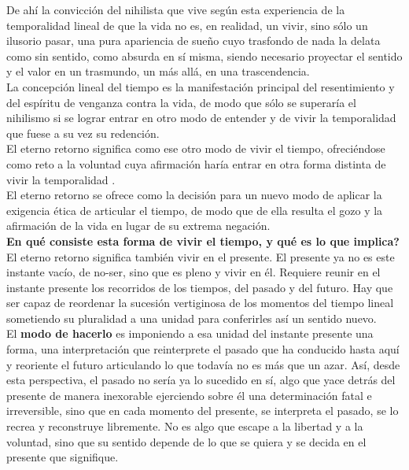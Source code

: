 \documentclass[a4paper, 10pt, twocolumn, spanish]{article}
\begin{document}
De ahí la convicción del nihilista que vive según esta experiencia de
la temporalidad lineal de que la vida no es, en realidad, un vivir,
sino sólo un ilusorio pasar, una pura apariencia de sueño cuyo
trasfondo de nada la delata como sin sentido, como absurda en sí
misma, siendo necesario proyectar el sentido y el valor en un
trasmundo, un más allá, en una trascendencia.\\[0pt]
La concepción lineal del tiempo es la manifestación principal del
resentimiento y del espíritu de venganza contra la vida, de modo que
sólo se superaría el nihilismo si se lograr entrar en otro modo de
entender y de vivir la temporalidad que fuese a su vez su redención.\\[0pt]

El eterno retorno significa como ese otro modo de vivir el tiempo,
ofreciéndose como reto a la voluntad cuya afirmación haría entrar en
otra forma distinta de vivir la temporalidad .\\[0pt]
El eterno retorno se ofrece como la decisión para un nuevo modo de
aplicar la exigencia ética de articular el tiempo, de modo que de ella
resulta el gozo y la afirmación de la vida en lugar de su extrema
negación.\\[0pt]


\textbf{En qué consiste esta forma de vivir el tiempo, y qué es lo que
implica?}\\[0pt]
El eterno retorno significa también vivir en el presente. El presente
ya no es este instante vacío, de no-ser, sino que es pleno y vivir en
él. Requiere reunir en el instante presente los recorridos de los
tiempos, del pasado y del futuro. Hay que ser capaz de reordenar la
sucesión vertiginosa de los momentos del tiempo lineal sometiendo su
pluralidad a una unidad para conferirles así un sentido nuevo.\\[0pt]

El \textbf{modo de hacerlo} es imponiendo a esa unidad del instante presente
una forma, una interpretación que reinterprete el pasado que ha
conducido hasta aquí y reoriente el futuro articulando lo que todavía
no es más que un azar. Así, desde esta perspectiva, el pasado no sería
ya lo sucedido en sí, algo que yace detrás del presente de manera
inexorable ejerciendo sobre él una determinación fatal e irreversible,
sino que en cada momento del presente, se interpreta el pasado, se lo
recrea y reconstruye libremente. No es algo que escape a la libertad y
a la voluntad, sino que su sentido depende de lo que se quiera y se
decida en el presente que signifique.\\[0pt]
\end{document}
